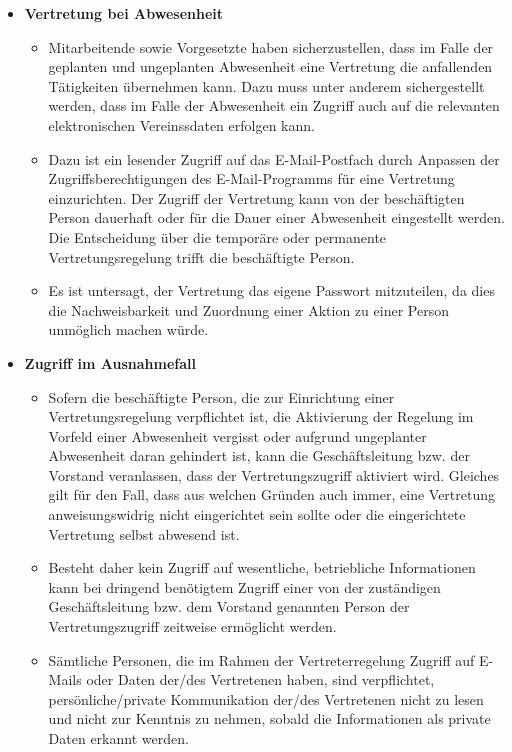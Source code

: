 \documentclass[a4paper, fontsize=11pt]{scrartcl}
\begin{document}
\begin{itemize}
  \item \textbf{Vertretung bei Abwesenheit}
  \begin{itemize}
    \item Mitarbeitende sowie Vorgesetzte haben sicherzustellen, dass im Falle der geplanten und ungeplanten Abwesenheit eine Vertretung die anfallenden Tätigkeiten übernehmen kann. Dazu muss unter anderem sichergestellt werden, dass im Falle der Abwesenheit ein Zugriff auch auf die relevanten elektronischen Vereinssdaten erfolgen kann.
    \item Dazu ist ein lesender Zugriff auf das E-Mail-Postfach durch Anpassen der Zugriffsberechtigungen des E-Mail-Programms für eine Vertretung einzurichten. Der Zugriff der Vertretung kann von der beschäftigten Person dauerhaft oder für die Dauer einer Abwesenheit eingestellt werden. Die Entscheidung über die temporäre oder permanente Vertretungsregelung trifft die beschäftigte Person.
    \item Es ist untersagt, der Vertretung das eigene Passwort mitzuteilen, da dies die Nachweisbarkeit und Zuordnung einer Aktion zu einer Person unmöglich machen würde.
  \end{itemize}
  \item \textbf{Zugriff im Ausnahmefall}
  \begin{itemize}
    \item Sofern die beschäftigte Person, die zur Einrichtung einer Vertretungsregelung verpflichtet ist, die Aktivierung der Regelung im Vorfeld einer Abwesenheit vergisst oder aufgrund ungeplanter Abwesenheit daran gehindert ist, kann die Geschäftsleitung bzw. der Vorstand veranlassen, dass der Vertretungszugriff aktiviert wird. Gleiches gilt für den Fall, dass aus welchen Gründen auch immer, eine Vertretung anweisungswidrig nicht eingerichtet sein sollte oder die eingerichtete Vertretung selbst abwesend ist.
    \item Besteht daher kein Zugriff auf wesentliche, betriebliche Informationen kann bei dringend benötigtem Zugriff einer von der zuständigen Geschäftsleitung bzw. dem Vorstand genannten Person der Vertretungszugriff zeitweise ermöglicht werden.
    \item Sämtliche Personen, die im Rahmen der Vertreterregelung Zugriff auf E-Mails oder Daten der/des Vertretenen haben, sind verpflichtet, persönliche/private Kommunikation der/des Vertretenen nicht zu lesen und nicht zur Kenntnis zu nehmen, sobald die Informationen als private Daten erkannt werden.
  \end{itemize}
\end{itemize}
\end{document}
